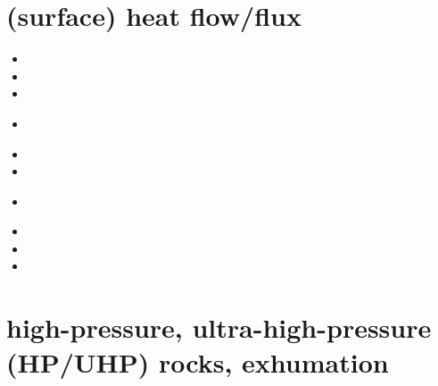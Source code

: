 \section{(surface) heat flow/flux}
\begin{small}
\begin{itemize}
\item[\nineteensixtyseven] 
\item[\nineteeneightythree]
\item[\nineteenninetyfive] 
\item[\nineteenninetyeight] 
 \\
\item[\nineteenninetynine] 
\item[\twothousandnine] 
\item[\twothousandfive] 
\\
\item[\twothousandten] 
\item[\twothousandthirteen] 
\item[\twothousandtwenty]
\end{itemize}
\end{small}



\section{high-pressure, ultra-high-pressure (HP/UHP) rocks, exhumation}

